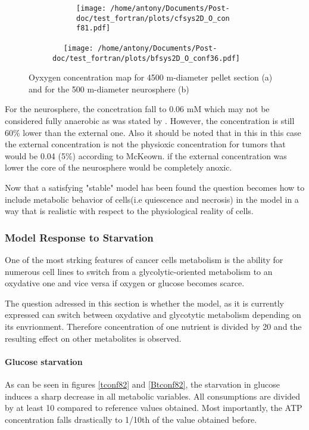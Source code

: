 \documentclass[11pt,a4paper]{article}
\begin{document}
\begin{figure}[ht!]
	\begin{subfigure}{0.45\textwidth}
	\centering
		\begin{subfigure}{0.45\textwidth}
	\texttt{[image: /home/antony/Documents/Post-doc/test\_fortran/plots/cfsys2D\_O\_conf81.pdf]}
		\caption{ \label{O_conf81}}
	\end{subfigure}
	~~
	\texttt{[image: /home/antony/Documents/Post-doc/test\_fortran/plots/bfsys2D\_O\_conf36.pdf]}
	\caption{ \label{O_conf36}}
	\end{subfigure}
	\caption{Oyxygen concentration map for 4500 \textmu m-diameter pellet section  (a) and for the 500 \textmu m-diameter neurosphere (b) \label{conf81}  }
\end{figure}
For the neurosphere, the concetration fall to 0.06 mM which may not be considered fully anaerobic as was stated by \cite{Kirsch1978}. However, the concentration is still 60\% lower than the external one. Also it should be noted that in this in this case the external concentration is not the physioxic concentration for tumors that would be 0.04 (5\%) according to McKeown. \cite{McKeown2014} if the external concentration was lower the core of the neurosphere would be completely anoxic.

Now that  a satisfying "stable" model has been found the question becomes how to include metabolic behavior of cells(i.e quiescence and necrosis) in the model in a way that is realistic with respect to the physiological reality of cells.

\subsubsection{Model Response to Starvation}
One of the most strking features of cancer cells metabolism is the ability for numerous cell lines to switch from a glycolytic-oriented metabolism to an oxydative one and vice versa if oxygen or glucose becomes scarce. \cite{MullerKlieser1986} \cite{Freyer1986}

The question adressed in this section is whether the model, as it is currently expressed can switch between oxydative and glycotytic metabolism depending on its envrionment. Therefore concentration of one nutrient is divided by 20 and the resulting effect on other metabolites is observed.

\paragraph{Glucose starvation}
As can be seen in figures \ref{tconf82} and \ref{Btconf82}, the starvation in glucose induces a sharp decrease in all metabolic variables. All consumptions are divided by at least 10 compared to reference values obtained. Most importantly, the ATP concentration falls drastically to 1/10th of the value obtained before.
\end{document}
